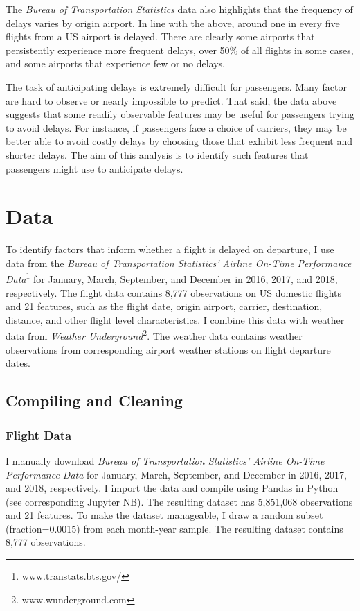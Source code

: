 \documentclass[
]{article}
\begin{document}
The \textit{Bureau of Transportation Statistics} data also highlights
that the frequency of delays varies by origin airport. In line with the
above, around one in every five flights from a US airport is delayed.
There are clearly some airports that persistently experience more
frequent delays, over 50\% of all flights in some cases, and some
airports that experience few or no delays.

The task of anticipating delays is extremely difficult for passengers.
Many factor are hard to observe or nearly impossible to predict. That
said, the data above suggests that some readily observable features may
be useful for passengers trying to avoid delays. For instance, if
passengers face a choice of carriers, they may be better able to avoid
costly delays by choosing those that exhibit less frequent and shorter
delays. The aim of this analysis is to identify such features that
passengers might use to anticipate delays.

\section{Data}

To identify factors that inform whether a flight is delayed on
departure, I use data from the
\textit{Bureau of Transportation Statistics' Airline On-Time Performance Data}\footnote{www.transtats.bts.gov/}
for January, March, September, and December in 2016, 2017, and 2018,
respectively. The flight data contains 8,777 observations on US domestic
flights and 21 features, such as the flight date, origin airport,
carrier, destination, distance, and other flight level characteristics.
I combine this data with weather data from
\textit{Weather Underground}\footnote{www.wunderground.com}. The weather
data contains weather observations from corresponding airport weather
stations on flight departure dates.

\subsection{Compiling and Cleaning}

\subsubsection{Flight Data}

I manually download
\textit{Bureau of Transportation Statistics' Airline On-Time Performance Data}
for January, March, September, and December in 2016, 2017, and 2018,
respectively. I import the data and compile using Pandas in Python (see
corresponding Jupyter NB). The resulting dataset has 5,851,068
observations and 21 features. To make the dataset manageable, I draw a
random subset (fraction=0.0015) from each month-year sample. The
resulting dataset contains 8,777 observations.
\end{document}
